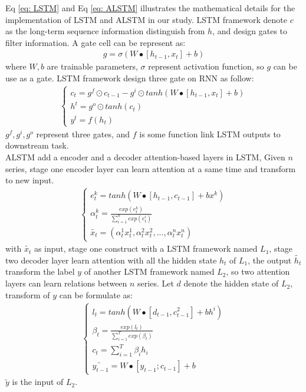 \documentclass[10pt,letterpaper]{article}
\begin{document}
Eq \ref {eq: LSTM} and Eq \ref {eq: ALSTM} illustrates the mathematical details for the implementation of LSTM and ALSTM in our study.
LSTM framework denote $c$ as the long-term sequence information distinguish from $h$, and design gates to filter information. A gate cell can be represent as:
\begin{eqnarray}
\label{eq: Gate}
    g = \sigma(W\bullet[h_{t - 1}, x_t] + b)
\end{eqnarray}
where $W, b$ are trainable parameters, $\sigma$ represent activation function, so $g$ can be use as a gate. LSTM framework design three gate on RNN as follow:
\begin{eqnarray}
\label{eq: LSTM}
    \begin {cases} c_t = g^f{\odot}c_{t - 1} - g^i{\odot}tanh(W\bullet[h_{t - 1}, x_t] + b)
    \\h^t = g^o{\odot}tanh(c_t)
    \\y^t = f(h_t)
    \end {cases}
\end{eqnarray}
$g^f, g^i, g^o$ represent three gates, and $f$ is some function link LSTM outputs to downstream task.
\\ALSTM add a encoder and a decoder attention-based layers in LSTM, Given $n$ series, stage one encoder layer can learn attention at a same time and transform to new input.
\begin{eqnarray}
\label{eq: ALSTM1}
    \begin {cases} e^k_t = tanh(W\bullet[h_{t - 1}, c_{t - 1}] + bx^k)
    \\{\alpha}^k_t = \frac{exp(e^k_t)}{\sum_{i=1}^n exp(e^i_t)}
    \\\widetilde{x_t} = ({\alpha^1_t}x^1_t, {\alpha^2_t}x^2_t,..., {\alpha^n_t}x^n_t)
    \end {cases}
\end{eqnarray}
with $\widetilde{x_t}$ as input, stage one construct with a LSTM framework named $L_1$, stage two decoder layer learn attention with all the hidden state $h_t$ of $L_1$,
the output $\widetilde{h_t}$ transform the label $y$ of another LSTM framework named $L_2$, so two attention layers can learn relations between $n$ series.
Let $d$ denote the hidden state of $L_2$, transform of $y$ can be formulate as:
\begin{eqnarray}
\label{eq: ALSTM2}
    \begin {cases} l_t = tanh(W\bullet[d_{t - 1}, c^2_{t - 1}] + bh^i)
    \\{\beta}_t = \frac{exp(l_t)}{\sum_{i=1}^T exp({\beta}_t)}
    \\c_t = \sum_{i=1}^T {\beta}_ih_i
    \\\widetilde{y_{t - 1}} = W\bullet[y_{t - 1}; c_{t - 1}] + b
    \end {cases}
\end{eqnarray}
$\tilde{y}$ is the input of $L_2$.
\end{document}
